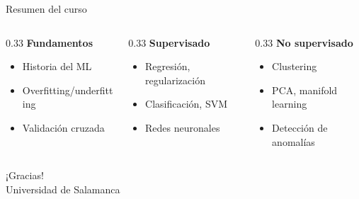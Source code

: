 \documentclass[aspectratio=169]{beamer}
\begin{document}
\begin{frame}{Resumen del curso}
  \begin{columns}
    \begin{column}{0.33\textwidth}
      \textbf{Fundamentos}
      \begin{itemize}
        \footnotesize
        \item Historia del ML
        \item Overfitting/underfitting
        \item Validación cruzada
      \end{itemize}
    \end{column}
    \begin{column}{0.33\textwidth}
      \textbf{Supervisado}
      \begin{itemize}
        \footnotesize
        \item Regresión, regularización
        \item Clasificación, SVM
        \item Redes neuronales
      \end{itemize}
    \end{column}
    \begin{column}{0.33\textwidth}
      \textbf{No supervisado}
      \begin{itemize}
        \footnotesize
        \item Clustering
        \item PCA, manifold learning
        \item Detección de anomalías
      \end{itemize}
    \end{column}
  \end{columns}
\end{frame}

\begin{frame}
  \centering
  {\Huge ¡Gracias!}\\[1em]
  {\large Universidad de Salamanca}
\end{frame}
\end{document}
